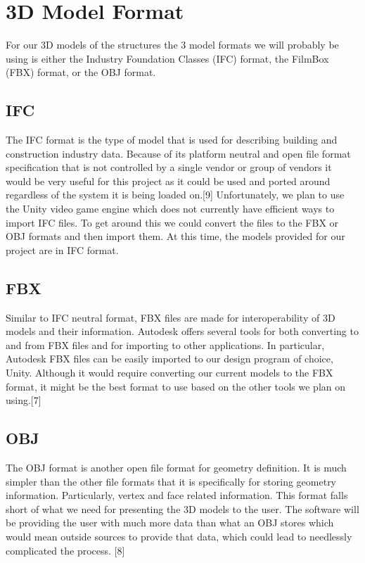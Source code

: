 \documentclass[onecolumn, draftclsnofoot,10pt, compsoc]{IEEEtran}
\begin{document}
\newpage
{}
\tableofcontents
\clearpage
\section{3D Model Format}
For our 3D models of the structures the 3 model formats we will probably be using is either the Industry Foundation Classes (IFC) format, the FilmBox (FBX) format, or the OBJ format.
\subsection{IFC}
The IFC  format is the type of model that is used for describing building and construction industry data. Because of its platform neutral and open file format specification that is not controlled by a single vendor or group of vendors it would be very useful for this project as it could be used and ported around regardless of the system it is being loaded on.[9] Unfortunately, we plan to use the Unity video game engine which does not currently have efficient ways to import IFC files. To get around this we could convert the files to the FBX or OBJ formats and then import them. At this time, the models provided for our project are in IFC format. 
\subsection{FBX}
Similar to IFC neutral format, FBX files are made for interoperability of 3D models and their information. Autodesk offers several tools for both converting to and from FBX files and for importing to other applications. In particular, Autodesk FBX files can be easily imported to our design program of choice, Unity. Although it would require converting our current models to the FBX format, it might be the best format to use based on the other tools we plan on using.[7]
\subsection{OBJ}
The OBJ format is another open file format for geometry definition. It is much simpler than the other file formats that it is specifically for storing geometry information. Particularly, vertex and face related information. This format falls short of what we need for presenting the 3D models to the user. The software will be providing the user with much more data than what an OBJ stores which would mean outside sources to provide that data, which could lead to needlessly complicated the process. [8]
\end{document}
